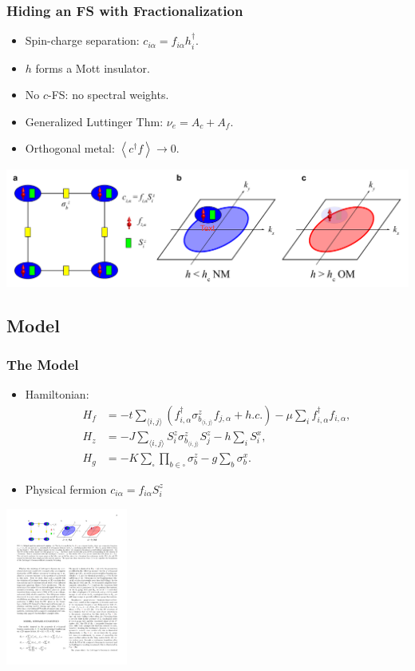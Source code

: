 \documentclass[xcolor=table, 10pt, aspectratio=43]{beamer}
\begin{document}
\begin{frame}
  \frametitle{Hiding an FS with Fractionalization}
  \begin{itemize}
    \item Spin-charge separation: $c_{i\alpha} = f_{i\alpha} h_i^\dagger$.
		\item $h$ forms a Mott insulator.
		\item No $c$-FS: no spectral weights.
		\item Generalized Luttinger Thm:
		$\nu_e = A_c + A_f$.
		\item Orthogonal metal: $\left<c^\dagger f\right>\rightarrow 0$.
  \end{itemize}
	\begin{center}
		\includegraphics[width=.8\textwidth]{../orthogonal_metal/hide_fs}
	\end{center}
\end{frame}

\subsection{Model}

\begin{frame}
	\frametitle{The Model}
\begin{itemize}
\item Hamiltonian:
	\begin{align*}
	H_f &= -t\sum_{\langle i,j \rangle} (f^{\dagger}_{i,\alpha} \sigma^{z}_{b_{\langle i,j \rangle}}f_{j,\alpha} + h.c.) -\mu\sum_{i}f^{\dagger}_{i,\alpha}f_{i,\alpha}, \nonumber\\
	H_{z} &= -J \sum_{\langle i,j \rangle} S^{z}_{i} \sigma^{z}_{b_{\langle i,j \rangle}} S^{z}_{j} - h \sum_{i} S^{x}_{i}, \nonumber\\
	H_{g} &= -K \sum_{\square}\prod_{b\in\square} \sigma^{z}_{b} - g\sum_{b} \sigma^{x}_{b}.
\end{align*}
\item Physical fermion $c_{i\alpha} = f_{i\alpha}S_i^z$
\end{itemize}
\begin{center}
	\includegraphics[width=4cm]{../orthogonal_metal/model_l}
\end{center}
\end{frame}
\end{document}

